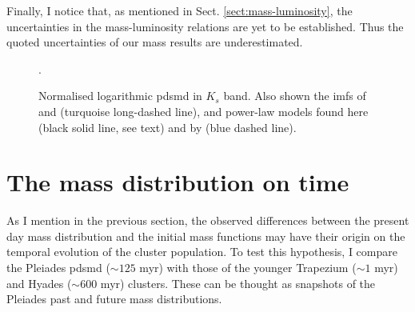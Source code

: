 Finally, I notice that, as mentioned in Sect. \ref{sect:mass-luminosity}, the uncertainties in the mass-luminosity relations are yet to be established. Thus the quoted uncertainties of our mass results are underestimated.

\begin{figure}[htbp]
\begin{center}
\caption{Normalised logarithmic \gls{pdsmd} in $K_s$ band. Also shown the \glspl{imf} of \citet{Chabrier2005} \cite[blue dotted line with uncertainties from][]{Chabrier2003b} and  \citet{Thies2007} (turquoise long-dashed line), and power-law models found here (black solid line, see text) and by \citet{Bouy2015} (blue dashed line).}
\label{fig:ModelMassFunction}.
\end{center}
\end{figure}

\section{The mass distribution on time}
\label{sect:massontime}
As I mention in the previous section, the observed differences between the present day mass distribution and the initial mass functions may have their origin on the temporal evolution of the cluster population. To test this hypothesis, I compare the Pleiades \gls{pdsmd} ($\sim125$ \gls{myr}) with those of the younger Trapezium ($\sim1$ \gls{myr}) and Hyades ($\sim 600$ \gls{myr}) clusters. These can be thought as snapshots of the Pleiades past and future mass distributions.

